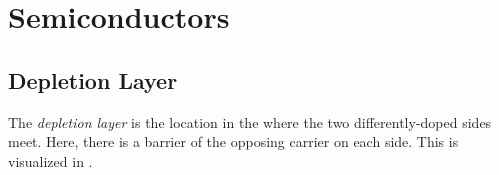 \section{Semiconductors}\label{sec:Semiconductors}
\subsection{Depletion Layer}\label{subsec:Depletion_Layer}
\begin{definition}\label{def:Depletion_Layer}
  The \emph{depletion layer} is the location in the \PNJunction{} where the two differently-doped sides meet.
  Here, there is a barrier of the opposing carrier on each side.
  This is visualized in .
\end{definition}


